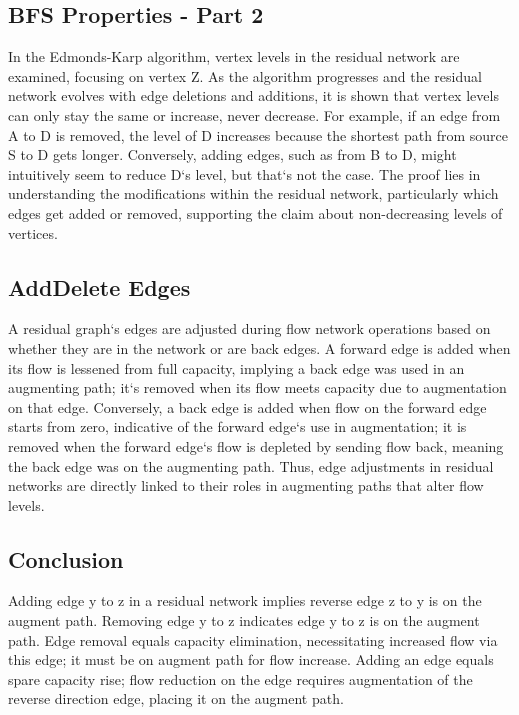 \subsection*{BFS Properties - Part 2}
In the Edmonds-Karp algorithm, vertex levels in the residual network are examined, focusing on vertex Z\@.
As the algorithm progresses and the residual network evolves with edge deletions and additions, it is shown that vertex levels can only stay the same or increase, never decrease.
For example, if an edge from A to D is removed, the level of D increases because the shortest path from source S to D gets longer.
Conversely, adding edges, such as from B to D, might intuitively seem to reduce D`s level, but that`s not the case.
The proof lies in understanding the modifications within the residual network, particularly which edges get added or removed, supporting the claim about non-decreasing levels of vertices.

\subsection*{AddDelete Edges}
A residual graph`s edges are adjusted during flow network operations based on whether they are in the network or are back edges.
A forward edge is added when its flow is lessened from full capacity, implying a back edge was used in an augmenting path; it`s removed when its flow meets capacity due to augmentation on that edge.
Conversely, a back edge is added when flow on the forward edge starts from zero, indicative of the forward edge`s use in augmentation; it is removed when the forward edge`s flow is depleted by sending flow back, meaning the back edge was on the augmenting path.
Thus, edge adjustments in residual networks are directly linked to their roles in augmenting paths that alter flow levels.

\subsection*{Conclusion}
Adding edge y to z in a residual network implies reverse edge z to y is on the augment path.
Removing edge y to z indicates edge y to z is on the augment path.
Edge removal equals capacity elimination, necessitating increased flow via this edge; it must be on augment path for flow increase.
Adding an edge equals spare capacity rise; flow reduction on the edge requires augmentation of the reverse direction edge, placing it on the augment path.

